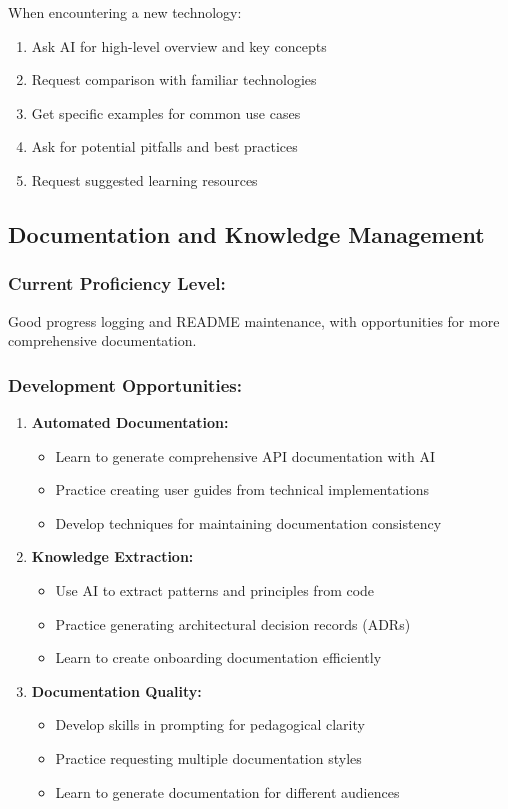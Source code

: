 \documentclass[12pt,a4paper]{article}
\begin{document}
When encountering a new technology:
\begin{enumerate}
    \item Ask AI for high-level overview and key concepts
    \item Request comparison with familiar technologies
    \item Get specific examples for common use cases
    \item Ask for potential pitfalls and best practices
    \item Request suggested learning resources
\end{enumerate}

\subsection{Documentation and Knowledge Management}

\subsubsection*{Current Proficiency Level:}
Good progress logging and README maintenance, with opportunities for more comprehensive documentation.

\subsubsection*{Development Opportunities:}

\begin{enumerate}
    \item \textbf{Automated Documentation:}
    \begin{itemize}
        \item Learn to generate comprehensive API documentation with AI
        \item Practice creating user guides from technical implementations
        \item Develop techniques for maintaining documentation consistency
    \end{itemize}
    
    \item \textbf{Knowledge Extraction:}
    \begin{itemize}
        \item Use AI to extract patterns and principles from code
        \item Practice generating architectural decision records (ADRs)
        \item Learn to create onboarding documentation efficiently
    \end{itemize}
    
    \item \textbf{Documentation Quality:}
    \begin{itemize}
        \item Develop skills in prompting for pedagogical clarity
        \item Practice requesting multiple documentation styles
        \item Learn to generate documentation for different audiences
    \end{itemize}
\end{enumerate}
\end{document}
